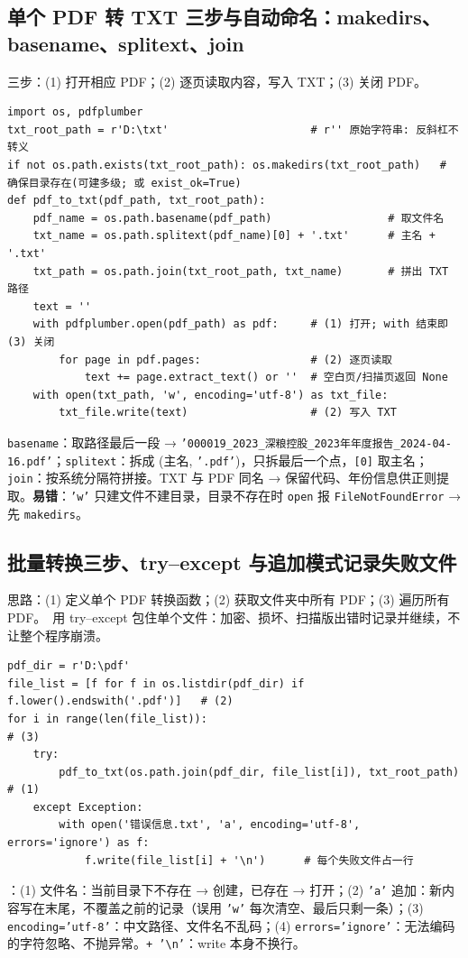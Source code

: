 \subsection{单个 PDF 转 TXT 三步与自动命名：makedirs、basename、splitext、join}
三步：(1) 打开相应 PDF；(2) 逐页读取内容，写入 TXT；(3) 关闭 PDF。
\begin{lstlisting}[style=pyD08a]
import os, pdfplumber
txt_root_path = r'D:\txt'                      # r'' 原始字符串: 反斜杠不转义
if not os.path.exists(txt_root_path): os.makedirs(txt_root_path)   # 确保目录存在(可建多级; 或 exist_ok=True)
def pdf_to_txt(pdf_path, txt_root_path):
    pdf_name = os.path.basename(pdf_path)                  # 取文件名
    txt_name = os.path.splitext(pdf_name)[0] + '.txt'      # 主名 + '.txt'
    txt_path = os.path.join(txt_root_path, txt_name)       # 拼出 TXT 路径
    text = ''
    with pdfplumber.open(pdf_path) as pdf:     # (1) 打开; with 结束即 (3) 关闭
        for page in pdf.pages:                 # (2) 逐页读取
            text += page.extract_text() or ''  # 空白页/扫描页返回 None
    with open(txt_path, 'w', encoding='utf-8') as txt_file:
        txt_file.write(text)                   # (2) 写入 TXT
\end{lstlisting}
\texttt{basename}：取路径最后一段 → \texttt{'000019\_2023\_深粮控股\_2023年年度报告\_2024-04-16.pdf'}；\texttt{splitext}：拆成 (主名, \texttt{'.pdf'})，只拆最后一个点，\texttt{[0]} 取主名；\texttt{join}：按系统分隔符拼接。TXT 与 PDF 同名 → 保留代码、年份信息供正则提取。\textbf{易错}：\texttt{'w'} 只建文件不建目录，目录不存在时 \texttt{open} 报 \texttt{FileNotFoundError} → 先 \texttt{makedirs}。

\subsection{批量转换三步、try–except 与追加模式记录失败文件}
思路：(1) 定义单个 PDF 转换函数；(2) 获取文件夹中所有 PDF；(3) 遍历所有 PDF。\tagext\ 用 try–except 包住单个文件：加密、损坏、扫描版出错时记录并继续，不让整个程序崩溃。
\begin{lstlisting}[style=pyD08a]
pdf_dir = r'D:\pdf'
file_list = [f for f in os.listdir(pdf_dir) if f.lower().endswith('.pdf')]   # (2)
for i in range(len(file_list)):                                              # (3)
    try:
        pdf_to_txt(os.path.join(pdf_dir, file_list[i]), txt_root_path)      # (1)
    except Exception:
        with open('错误信息.txt', 'a', encoding='utf-8', errors='ignore') as f:
            f.write(file_list[i] + '\n')      # 每个失败文件占一行
\end{lstlisting}
：(1) 文件名：当前目录下不存在 → 创建，已存在 → 打开；(2) \texttt{'a'} 追加：新内容写在末尾，不覆盖之前的记录（误用 \texttt{'w'} 每次清空、最后只剩一条）；(3) \texttt{encoding='utf-8'}：中文路径、文件名不乱码；(4) \texttt{errors='ignore'}：无法编码的字符忽略、不抛异常。\texttt{+ '\textbackslash n'}：write 本身不换行。

